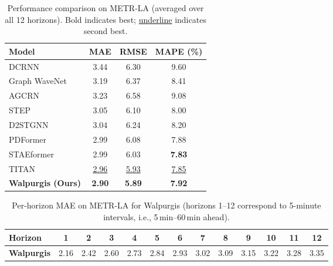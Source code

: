 

\begin{table}[h]
\centering
\caption{Performance comparison on METR-LA (averaged over all 12 horizons).
  Bold indicates best; \underline{underline} indicates second best.}
\label{tab:sota_metrla}
\setlength{\tabcolsep}{6pt}
\begin{tabular}{lccc}
\toprule
\textbf{Model} & \textbf{MAE} & \textbf{RMSE} & \textbf{MAPE (\%)} \\
\midrule
DCRNN~\cite{li2018dcrnn}           & 3.44 & 6.30 & 9.60 \\
Graph WaveNet~\cite{wu2019graphwavenet} & 3.19 & 6.37 & 8.41 \\
AGCRN~\cite{bai2020agcrn}           & 3.23 & 6.58 & 9.08 \\
STEP~\cite{shao2022step}             & 3.05 & 6.10 & 8.00 \\
D2STGNN~\cite{shao2022d2stgnn}      & 3.04 & 6.24 & 8.20 \\
PDFormer~\cite{jiang2023pdformer}    & 2.99 & 6.08 & 7.88 \\
STAEformer~\cite{liu2023staeformer} & 2.99 & 6.03 & \textbf{7.83} \\
TITAN~\cite{wang2024titan}           & \underline{2.96} & \underline{5.93} & \underline{7.85} \\
\midrule
\textbf{Walpurgis (Ours)}           & \textbf{2.90} & \textbf{5.89} & \textbf{7.92} \\
\bottomrule
\end{tabular}
\end{table}



\begin{table}[h]
\centering
\caption{Per-horizon MAE on METR-LA for Walpurgis (horizons 1–12 correspond
  to 5-minute intervals, i.e., 5\,min–60\,min ahead).}
\label{tab:perhorizon_metrla}
\setlength{\tabcolsep}{5pt}
\begin{tabular}{lcccccccccccc}
\toprule
\textbf{Horizon} & 1 & 2 & 3 & 4 & 5 & 6 & 7 & 8 & 9 & 10 & 11 & 12 \\
\midrule
\textbf{Walpurgis}
  & 2.16 & 2.42 & 2.60 & 2.73 & 2.84 & 2.93
  & 3.02 & 3.09 & 3.15 & 3.22 & 3.28 & 3.35 \\
\bottomrule
\end{tabular}
\end{table}


